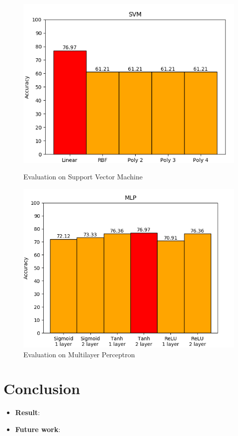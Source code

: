 \documentclass[a4paper,oneside]{article}
\begin{document}
\begin{figure}
	\centering
	\begin{minipage}[t]{8.6cm}
\includegraphics[width=1\linewidth]{SVM}
  \centering
  \caption{Evaluation on Support Vector Machine}
  \label{fig:SVM}
	\end{minipage}
	\begin{minipage}[t]{8.6cm}
	\includegraphics[width=1\linewidth]{MLP}
  \centering
  \caption{Evaluation on Multilayer Perceptron}
  \label{fig:MLP}
	\end{minipage}
\end{figure}


\section{Conclusion}
\begin{itemize}
\item \textbf{Result}: 
\item \textbf{Future work}: 
\end{itemize}
\end{document}
